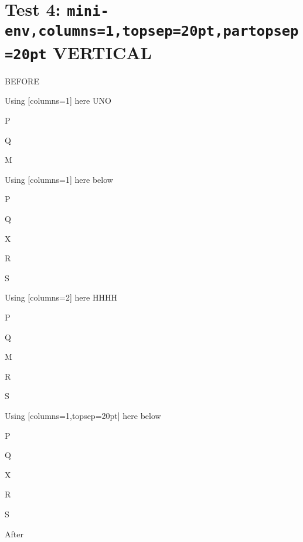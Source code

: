 \documentclass[10pt]{article}
\begin{document}
\newpage

\section{Test 4: \texttt{mini-env,columns=1,topsep=20pt,partopsep=20pt} VERTICAL}

BEFORE
\begin{enumext}[columns=2]
\item Using [columns=1] here UNO

  \begin{enumext}[columns=1,topsep=20pt,partopsep=20pt]%
     \item  P \item Q \item M %
  \end{enumext}

\item Using [columns=1] here below

\begin{enumext}[columns=1,topsep=20pt,,partopsep=20pt]%
     \item  P \item Q \item X  \item R \item S
  \end{enumext}

\columnbreak

\item Using [columns=2] here HHHH

  \begin{enumext}[columns=2,topsep=20pt,partopsep=20pt]%
    \item  P \item Q \item M \item R \item S
  \end{enumext}

\item Using [columns=1,topsep=20pt] here below

\begin{enumext}[columns=1,topsep=20pt,,partopsep=20pt]%
     \item  P \item Q \item X  \item R \item S
  \end{enumext}

\end{enumext}
After
\end{document}
